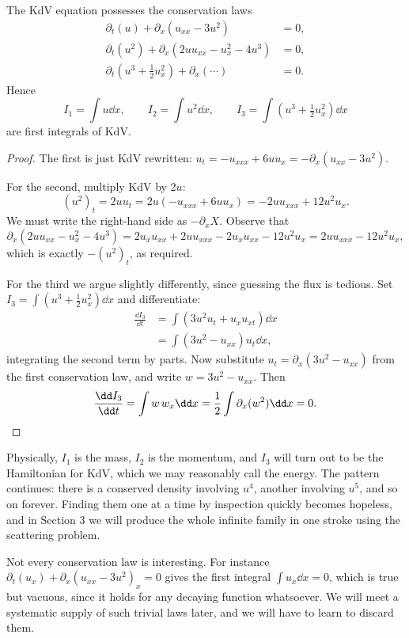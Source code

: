 \begin{proposition}
	The KdV equation possesses the conservation laws
	\begin{align*}
		\partial_t(u) + \partial_x\left(u_{xx} - 3u^2\right) &= 0,\\
		\partial_t(u^2) + \partial_x\left(2uu_{xx} - u_x^2 - 4u^3\right) &= 0,\\
		\partial_t\left(u^3 + \tfrac{1}{2}u_x^2\right) + \partial_x\left(\cdots\right) &= 0.
	\end{align*}
	Hence
	$$
	I_1 = \int u \dd x, \qquad I_2 = \int u^2\dd x, \qquad I_3 = \int\left(u^3 + \tfrac{1}{2}u_x^2\right)\dd x
	$$
	are first integrals of KdV.
\end{proposition}
\begin{proof}
	The first is just KdV rewritten: $u_t = -u_{xxx} + 6uu_x = -\partial_x(u_{xx} - 3u^2)$.

	For the second, multiply KdV by $2u$:
	$$
	(u^2)_t = 2uu_t = 2u(-u_{xxx} + 6uu_x) = -2uu_{xxx} + 12u^2u_x.
	$$
	We must write the right-hand side as $-\partial_x X$. Observe that
	$$
	\partial_x(2uu_{xx} - u_x^2 - 4u^3) = 2u_xu_{xx} + 2uu_{xxx} - 2u_xu_{xx} - 12u^2u_x = 2uu_{xxx} - 12u^2u_x,
	$$
	which is exactly $-(u^2)_t$, as required.

	For the third we argue slightly differently, since guessing the flux is tedious. Set $I_3 = \int(u^3 + \frac{1}{2}u_x^2)\dd x$ and differentiate:
	\begin{align*}
		\frac{\dd I_3}{\dd t} &= \int\left(3u^2u_t + u_xu_{xt}\right)\dd x\\
		&= \int\left(3u^2 - u_{xx}\right)u_t\dd x,
	\end{align*}
	integrating the second term by parts. Now substitute $u_t = \partial_x(3u^2 - u_{xx})$ from the first conservation law, and write $w = 3u^2 - u_{xx}$. Then
	$$
	\frac{\dd I_3}{\dd t} = \int w\, w_x\dd x = \frac{1}{2}\int\partial_x(w^2)\dd x = 0. \qedhere
	$$
\end{proof}

Physically, $I_1$ is the mass, $I_2$ is the momentum, and $I_3$ will turn out to be the Hamiltonian for KdV, which we may reasonably call the energy. The pattern continues: there is a conserved density involving $u^4$, another involving $u^5$, and so on forever. Finding them one at a time by inspection quickly becomes hopeless, and in Section 3 we will produce the whole infinite family in one stroke using the scattering problem.

\begin{remark}
	Not every conservation law is interesting. For instance $\partial_t(u_x) + \partial_x(u_{xx}-3u^2)_x = 0$ gives the first integral $\int u_x\dd x = 0$, which is true but vacuous, since it holds for any decaying function whatsoever. We will meet a systematic supply of such trivial laws later, and we will have to learn to discard them.
\end{remark}

